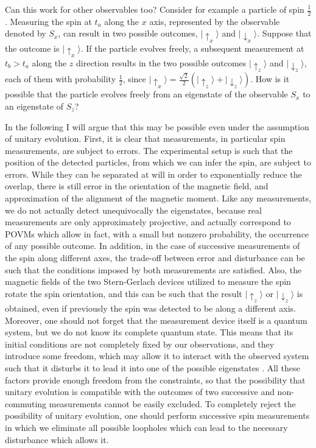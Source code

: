 \documentclass[12pt]{amsart}
\theoremstyle{definition}
\theoremstyle{plain}
\begin{document}
Can this work for other observables too? Consider for example a particle of spin $\frac 1 2$. Measuring the spin at $t_a$ along the $x$ axis, represented by the observable denoted by $S_x$, can result in two possible outcomes, $|{\uparrow_x}\rangle$ and $|{\downarrow_x}\rangle$. Suppose that the outcome is $|{\uparrow_x}\rangle$. If the particle evolves freely, a subsequent measurement at $t_b>t_a$ along the $z$ direction results in the two possible outcomes $|{\uparrow_z}\rangle$ and $|{\downarrow_z}\rangle$, each of them with probability $\frac 1 2$, since $|{\uparrow_x}\rangle = \frac{\sqrt 2}2\left(|{\uparrow_z}\rangle+|{\downarrow_z}\rangle\right)$. How is it possible that the particle evolves freely from an eigenstate of the observable $S_x$ to an eigenstate of $S_z$?

In the following I will argue that this may be possible even under the assumption of unitary evolution. First, it is clear that measurements, in particular spin measurements, are subject to errors. The experimental setup is such that the position of the detected particles, from which we can infer the spin, are subject to errors. While they can be separated at will in order to exponentially reduce the overlap, there is still error in the orientation of the magnetic field, and approximation of the alignment of the magnetic moment. Like any measurements, we do not actually detect unequivocally the eigenstates, because real measurements are only approximately projective, and actually correspond to POVMs which allow in fact, with a small but nonzero probability, the occurrence of any possible outcome. In addition, in the case of successive measurements of the spin along different axes, the trade-off between error and disturbance can be such that the conditions imposed by both measurements are satisfied. Also, the magnetic fields of the two Stern-Gerlach devices utilized to measure the spin rotate the spin orientation, and this can be such that the result $|{\uparrow_z}\rangle$ or $|{\downarrow_z}\rangle$ is obtained, even if previously the spin was detected to be along a different axis. Moreover, one should not forget that the measurement device itself is a quantum system, but we do not know its complete quantum state. This means that its initial conditions are not completely fixed by our observations, and they introduce some freedom, which may allow it to interact with the observed system such that it disturbs it to lead it into one of the possible eigenstates \cite{Sto08b,Sto12QMc}. All these factors provide enough freedom from the constraints, so that the possibility that unitary evolution is compatible with the outcomes of two successive and non-commuting measurements cannot be easily excluded. To completely reject the possibility of unitary evolution, one should perform successive spin measurements in which we eliminate all possible loopholes which can lead to the necessary disturbance which allows it.
\end{document}
